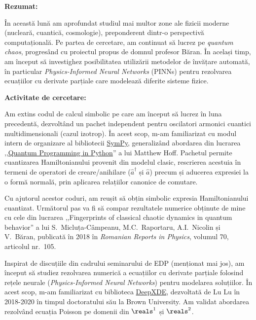 
\makereportpreamble

\textbf{Rezumat:}

În această lună am aprofundat studiul mai multor zone ale fizicii moderne (nucleară, cuantică, cosmologie), preponderent dintr-o perspectivă computațională. Pe partea de cercetare, am continuat să lucrez pe \emph{quantum chaos}, progresând cu proiectul propus de domnul profesor Băran. În același timp, am început să investighez posibilitatea utilizării metodelor de învățare automată, în particular \emph{Physics-Informed Neural Networks} (PINNs) pentru rezolvarea ecuațiilor cu derivate parțiale care modelează diferite sisteme fizice.

\vspace{0.5em}

\textbf{Activitate de cercetare:}

Am extins codul de calcul simbolic pe care am început să lucrez în luna precedentă, dezvoltând un pachet independent pentru oscilatori armonici cuantici multidimensionali (cazul izotrop). În acest scop, m-am familiarizat cu modul intern de organizare al bibliotecii \href{https://www.sympy.org/en/index.html}{SymPy}, generalizând abordarea din lucrarea ,,\href{https://digitalcommons.calpoly.edu/cgi/viewcontent.cgi?article=1072&context=physsp/}{Quantum Programming in Python}'' a lui Matthew Hoff. Pachetul permite cuantizarea Hamiltonianului provenit din modelul clasic, rescrierea acestuia în termeni de operatori de creare/anihilare (\(\hat{a}^{\dagger}\) și \(\hat{a}\)) precum și aducerea expresiei la o formă normală, prin aplicarea relațiilor canonice de comutare.

Cu ajutorul acestor coduri, am reușit să obțin simbolic expresia Hamiltonianului cuantizat. Următorul pas va fi să compar rezultatele numerice obținute de mine cu cele din lucrarea ,,Fingerprints of classical chaotic dynamics in quantum behavior'' a lui S.~Micluța-Câmpeanu, M.C.~Raportaru, A.I.~Nicolin și V.~Băran, publicată în 2018 în \emph{Romanian Reports in Physics}, volumul 70, articolul nr.~105.

Inspirat de discuțiile din cadrului seminarului de EDP (menționat mai jos), am început să studiez rezolvarea numerică a ecuațiilor cu derivate parțiale folosind rețele neurale (\emph{Physics-Informed Neural Networks}) pentru modelarea soluțiilor. În acest scop, m-am familiarizat cu biblioteca \href{https://deepxde.readthedocs.io/en/latest/}{DeepXDE}, dezvoltată de Lu Lu în 2018-2020 în timpul doctoratului său la Brown University. Am validat abordarea rezolvând ecuația Poisson pe domenii din \(\reals^1\) și \(\reals^2\).

